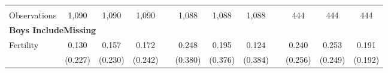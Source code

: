 \begin{landscape}
\begin{table}[htpb!]
\begin{center}
\begin{tabular}{lcccp{2mm}cccp{2mm}ccc}
\begin{footnotesize}\end{footnotesize}&\begin{footnotesize}\end{footnotesize}&\begin{footnotesize}\end{footnotesize}&\begin{footnotesize}\end{footnotesize}&\begin{footnotesize}\end{footnotesize}&\begin{footnotesize}\end{footnotesize}&\begin{footnotesize}\end{footnotesize}&\begin{footnotesize}\end{footnotesize}&\begin{footnotesize}\end{footnotesize}&\begin{footnotesize}\end{footnotesize}&\begin{footnotesize}\end{footnotesize}&\begin{footnotesize}\end{footnotesize}\\Observations&1,090&1,090&1,090&&1,088&1,088&1,088&&444&444&444\\
\multicolumn{12}{l}{\textbf{Boys IncludeMissing}}\\ 
Fertility&0.130&0.157&0.172&&0.248&0.195&0.124&&0.240&0.253&0.191\\
&(0.227)&(0.230)&(0.242)&&(0.380)&(0.376)&(0.384)&&(0.256)&(0.249)&(0.192)\\

\end{tabular}
\end{center}
\end{table}
\end{landscape}
